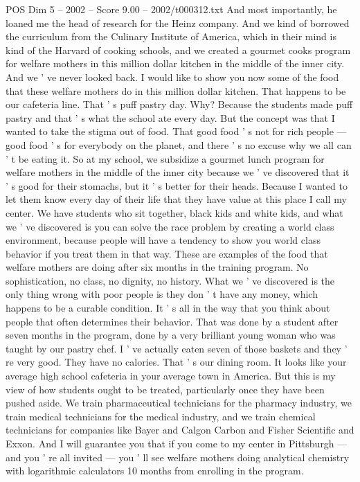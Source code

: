 \begin{textsample}{POS Dim 5 – 2002 – Score 9.00 – 2002/t000312.txt}
And most importantly, he loaned me the head of research for the Heinz company.
And we kind of borrowed the curriculum from the Culinary Institute of America, which in their mind is kind of the Harvard of cooking schools, and we created a gourmet cooks program for welfare mothers in this million dollar kitchen in the middle of the inner city.
And we ' ve never looked back.
I would like to show you now some of the food that these welfare mothers do in this million dollar kitchen.
That happens to be our cafeteria line.
That ' s puff pastry day.
Why?
Because the students made puff pastry and that ' s what the school ate every day.
But the concept was that I wanted to take the stigma out of food.
That good food ' s not for rich people — good food ' s for everybody on the planet, and there ' s no excuse why we all can ' t be eating it.
So at my school, we subsidize a gourmet lunch program for welfare mothers in the middle of the inner city because we ' ve discovered that it ' s good for their stomachs, but it ' s better for their heads.
Because I wanted to let them know every day of their life that they have value at this place I call my center.
We have students who sit together, black kids and white kids, and what we ' ve discovered is you can solve the race problem by creating a world class environment, because people will have a tendency to show you world class behavior if you treat them in that way.
These are examples of the food that welfare mothers are doing after six months in the training program.
No sophistication, no class, no dignity, no history.
What we ' ve discovered is the only thing wrong with poor people is they don ' t have any money, which happens to be a curable condition.
It ' s all in the way that you think about people that often determines their behavior.
That was done by a student after seven months in the program, done by a very brilliant young woman who was taught by our pastry chef.
I ' ve actually eaten seven of those baskets and they ' re very good.
They have no calories.
That ' s our dining room.
It looks like your average high school cafeteria in your average town in America.
But this is my view of how students ought to be treated, particularly once they have been pushed aside.
We train pharmaceutical technicians for the pharmacy industry, we train medical technicians for the medical industry, and we train chemical technicians for companies like Bayer and Calgon Carbon and Fisher Scientific and Exxon.
And I will guarantee you that if you come to my center in Pittsburgh — and you ' re all invited — you ' ll see welfare mothers doing analytical chemistry with logarithmic calculators 10 months from enrolling in the program.

\end{textsample}
